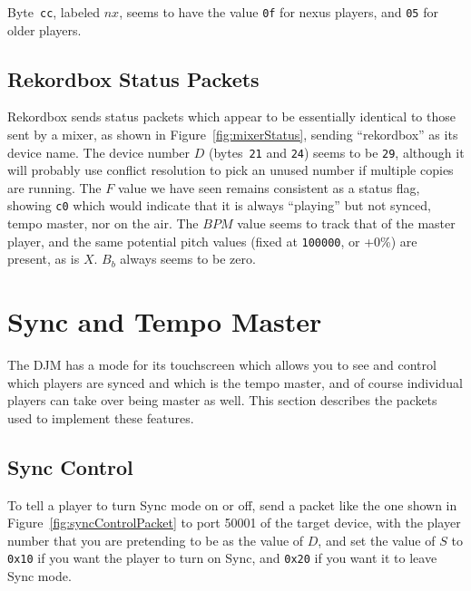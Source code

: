 \documentclass[11pt]{article}
\begin{document}
Byte~{\tt cc}, labeled $nx$, seems to have the value {\tt 0f} for
nexus players, and {\tt 05} for older players.

\subsection{Rekordbox Status Packets}

Rekordbox sends status packets which appear to be essentially
identical to those sent by a mixer, as shown in
Figure~\ref{fig:mixerStatus}, sending ``rekordbox'' as its device
name. The device number $D$ (bytes~{\tt 21} and {\tt 24}) seems to be
{\tt 29}, although it will probably use conflict resolution to pick an
unused number if multiple copies are running. The $F$ value we have
seen remains consistent as a status flag, showing {\tt c0} which would
indicate that it is always ``playing'' but not synced, tempo master,
nor on the air. The $BPM$ value seems to track that of the master
player, and the same potential pitch values (fixed at {\tt 100000}, or
+0\%) are present, as is $X$. $B_b$ always seems to be zero.

\section{Sync and Tempo Master}
\label{sec:sync}

The DJM has a mode for its touchscreen which allows you to see and
control which players are synced and which is the tempo master, and of
course individual players can take over being master as well. This
section describes the packets used to implement these features.

\subsection{Sync Control}

To tell a player to turn Sync mode on or off, send a packet like the
one shown in Figure~\ref{fig:syncControlPacket} to port 50001 of the
target device, with the player number that you are pretending to be as
the value of $D$, and set the value of $S$ to {\tt 0x10} if you want
the player to turn on Sync, and {\tt 0x20} if you want it to leave
Sync mode.
\end{document}
